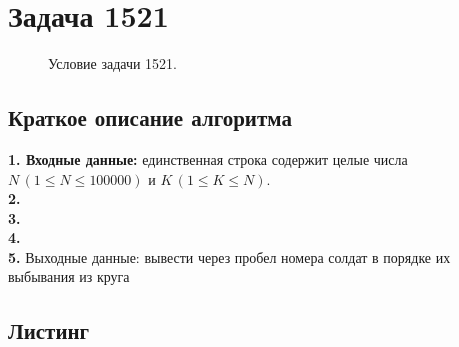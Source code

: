 \documentclass[a5paper, 10pt]{article}
\theoremstyle{definition}
\theoremstyle{plain}
\theoremstyle{remark}
\begin{document}
\newpage
\section{Задача 1521}

\begin{figure}[h!]
\caption{Условие задачи 1521.}
\end{figure}

\subsection{Краткое описание алгоритма}
\textbf{1. Входные данные:} единственная строка содержит целые числа $N\, (1 \leq N \leq 100000)$ и $K \, (1 \leq K \leq N)$. \\
\textbf{2.}  \\
\textbf{3.}  \\
\textbf{4.}  \\
\textbf{5.} Выходные данные: вывести через пробел номера солдат в порядке их выбывания из круга




\subsection{Листинг}
\end{document}
